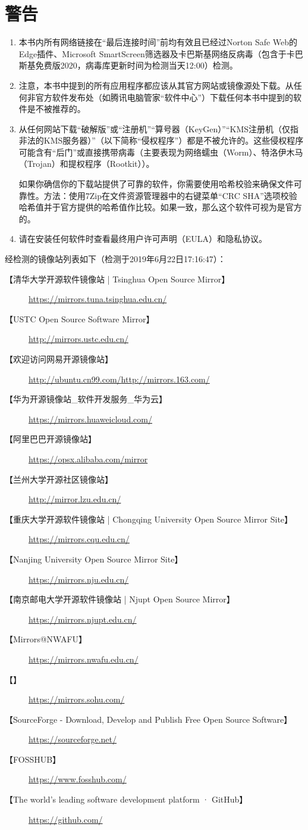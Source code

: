 \section{警告}
\begin{enumerate}
\item 本书内所有网络链接在“最后连接时间”前均有效且已经过Norton Safe Web的Edge插件、Microsoft SmartScreen筛选器及卡巴斯基网络反病毒（包含于卡巴斯基免费版2020，病毒库更新时间为检测当天12:00）检测。 
\item 注意，本书中提到的所有应用程序都应该从其官方网站或镜像源处下载。从任何非官方软件发布处（如腾讯电脑管家“软件中心”）下载任何本书中提到的软件是不被推荐的。\par 
\item 从任何网站下载“破解版”或“注册机”“算号器（KeyGen）”“KMS注册机（仅指非法的KMS服务器）”（以下简称“侵权程序”）都是不被允许的。这些侵权程序可能含有“后门”或直接携带病毒（主要表现为网络蠕虫（Worm）、特洛伊木马（Trojan）和提权程序（Rootkit））\cite{HR1}\cite{HR2}\cite{HR3}\cite{HR4}\cite{HR5}。\par
如果你确信你的下载站提供了可靠的软件，你需要使用哈希校验来确保文件可靠性。方法：使用7Zip在文件资源管理器中的右键菜单“CRC SHA”选项校验哈希值并于官方提供的哈希值作比较。如果一致，那么这个软件可视为是官方的。
\item 请在安装任何软件时查看最终用户许可声明（EULA）和隐私协议。
\end{enumerate}
经检测的镜像站列表如下（检测于2019年6月22日17:16:47）：
\begin{description}
	\item [【清华大学开源软件镜像站 | Tsinghua Open Source Mirror】]\url{https://mirrors.tuna.tsinghua.edu.cn/}
	\item [【USTC Open Source Software Mirror】]\url{http://mirrors.ustc.edu.cn/}
	\item [【欢迎访问网易开源镜像站】]\url{http://ubuntu.cn99.com/}\url{http://mirrors.163.com/}
	\item [【华为开源镜像站\_软件开发服务\_华为云】]\url{https://mirrors.huaweicloud.com/}
	\item [【阿里巴巴开源镜像站】]\url{https://opsx.alibaba.com/mirror}
	\item [【兰州大学开源社区镜像站】]\url{http://mirror.lzu.edu.cn/}
	\item [【重庆大学开源软件镜像站 | Chongqing University Open Source Mirror Site】] \url{https://mirrors.cqu.edu.cn/}
	\item [【Nanjing University Open Source Mirror Site】] \url{https://mirrors.nju.edu.cn/}
	\item [【南京邮电大学开源软件镜像站 | Njupt Open Source Mirror】]\url{https://mirrors.njupt.edu.cn/}
	\item [【Mirrors@NWAFU】]\url{https://mirrors.nwafu.edu.cn/}
	\item [【】]\url{https://mirrors.sohu.com/}
	\item [【SourceForge - Download, Develop and Publish Free Open Source Software】] \url{https://sourceforge.net/}
	\item [【FOSSHUB】] \url{https://www.fosshub.com/}
	\item [【The world’s leading software development platform · GitHub】] \url{https://github.com/}
\end{description}
